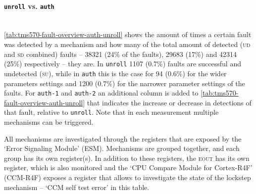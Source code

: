\documentclass[10pt]{article}
\newcommand{\unroll}{\texttt{unroll}\xspace}
\newcommand{\auth}{\texttt{auth}\xspace}
\newcommand{\authone}{\texttt{auth-1}\xspace}
\newcommand{\authtwo}{\texttt{auth-2}\xspace}
\newcommand{\UD}{\textsc{ud}\xspace}
\newcommand{\SU}{\textsc{su}\xspace}
\newcommand{\SD}{\textsc{sd}\xspace}
\newcommand{\errorpin}{\textsc{eout}\xspace}
\begin{document}
      \paragraph*{\unroll vs. \auth } \ \\ \noindent
        \autoref{tab:tms570-fault-overview-auth-unroll} shows the amount of times a certain fault was detected by a mechanism and how many of the total amount of detected (\UD and \SD combined) faults -- 38321 (24\% of the faults), 29683 (17\%) and 42314 (25\%) respectively -- they are. 
        In \unroll 1107 (0.7\%) faults are successful and undetected (\SU), while in \auth this is the case for 94 (0.6\%) for the wider parameters settings and 1200 (0.7\%) for the narrower parameter settings of the faults. For \authone and \authtwo an additional column is added to \autoref{tab:tms570-fault-overview-auth-unroll} that indicates the increase or decrease in detections of that fault, relative to \unroll. Note that in each measurement multiple mechanisms can be triggered.

        All mechanisms are investigated through the registers that are exposed by the `Error Signaling Module' (ESM). Mechanisms are grouped together, and each group has its own register(s). In addition to these registers, the \errorpin has its own register, which is also monitored and the `CPU Compare Module for Cortex-R4F' (CCM-R4F) exposes a register that allows to investigate the state of the lockstep mechanism -- `CCM self test error' in this table.
     
\end{document}
